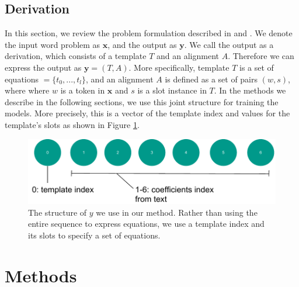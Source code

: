 \documentclass[11pt,letterpaper]{article}
\begin{document}
\subsection{Derivation}
In this section, we review the problem formulation described in \cite{Kushman2014LearningTA} and \cite{UpChChYi16}. We denote the input word problem as $\textbf{x}$, and the output as $\textbf{y}$. We call the output as a derivation, which consists of a template $T$ and an alignment $A$. Therefore we can express the output as $\textbf{y} = (T, A)$. More specifically, template $T$ is a set of equations $= \{t_0, ..., t_l\}$, and an alignment $A$ is defined as a set of pairs $(w, s)$, where where $w$ is a token in $\textbf{x}$ and $s$ is a slot instance in $T$. In the methods we describe in the following sections, we use this joint structure for training the models. More precisely, this is a vector of the template index and values for the template's slots as shown in Figure \ref{derivation}.
\begin{figure}[ht]
	\centering
	\includegraphics[bb=0 0 426 112, scale=0.5]{derivation.pdf}
    \caption{The structure of $y$ we use in our method. Rather than using the entire sequence to express equations, we use a template index and its slots to specify a set of equations.}
    \label{derivation}
\end{figure}
\section{Methods}
\end{document}
